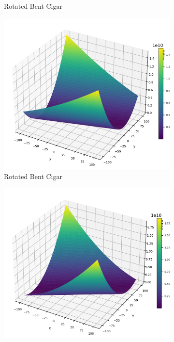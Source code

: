 \begin{figure}[p]
\begin{subfigure}{0.32\textwidth}
        \caption{Rotated Bent Cigar}
    \end{subfigure}
    \begin{subfigure}{0.32\textwidth}
        \centering
        \includegraphics[width=1\textwidth]{Figures/benchmark_plots/Rotated_Discus_maximized.png}
        \caption{Rotated Bent Cigar}
    \end{subfigure}
        \begin{subfigure}{0.32\textwidth}
        \centering
        \includegraphics[width=1\textwidth]{Figures/benchmark_plots/Rotated_High_Conditioned_Elliptic_maximized.png}

\end{subfigure}
\end{figure}
